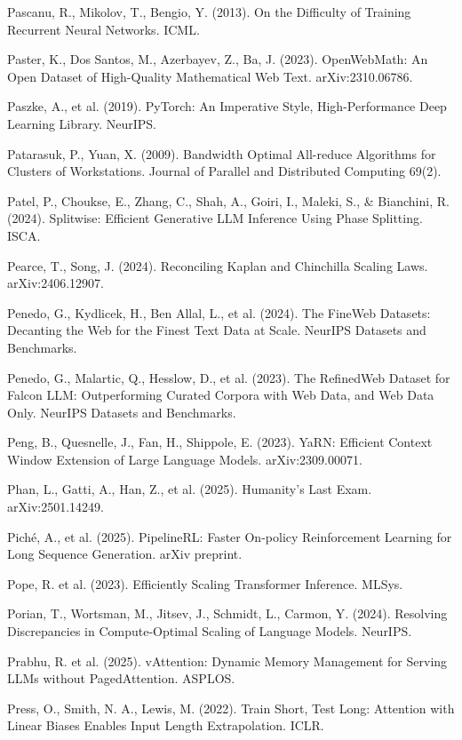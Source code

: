 {\begin{enumerate}[leftmargin=*,itemsep=1pt,label={[\arabic*]}]
\item Pascanu, R., Mikolov, T., Bengio, Y. (2013). On the Difficulty of Training Recurrent Neural Networks. ICML.
\item Paster, K., Dos Santos, M., Azerbayev, Z., Ba, J. (2023). OpenWebMath: An Open Dataset of High-Quality Mathematical Web Text. arXiv:2310.06786.
\item Paszke, A., et al. (2019). PyTorch: An Imperative Style, High-Performance Deep Learning Library. NeurIPS.
\item Patarasuk, P., Yuan, X. (2009). Bandwidth Optimal All-reduce Algorithms for Clusters of Workstations. Journal of Parallel and Distributed Computing 69(2).
\item Patel, P., Choukse, E., Zhang, C., Shah, A., Goiri, I., Maleki, S., \& Bianchini, R. (2024). Splitwise: Efficient Generative LLM Inference Using Phase Splitting. ISCA.
\item Pearce, T., Song, J. (2024). Reconciling Kaplan and Chinchilla Scaling Laws. arXiv:2406.12907.
\item Penedo, G., Kydlicek, H., Ben Allal, L., et al. (2024). The FineWeb Datasets: Decanting the Web for the Finest Text Data at Scale. NeurIPS Datasets and Benchmarks.
\item Penedo, G., Malartic, Q., Hesslow, D., et al. (2023). The RefinedWeb Dataset for Falcon LLM: Outperforming Curated Corpora with Web Data, and Web Data Only. NeurIPS Datasets and Benchmarks.
\item Peng, B., Quesnelle, J., Fan, H., Shippole, E. (2023). YaRN: Efficient Context Window Extension of Large Language Models. arXiv:2309.00071.
\item Phan, L., Gatti, A., Han, Z., et al. (2025). Humanity's Last Exam. arXiv:2501.14249.
\item Piché, A., et al. (2025). PipelineRL: Faster On-policy Reinforcement Learning for Long Sequence Generation. arXiv preprint.
\item Pope, R. et al. (2023). Efficiently Scaling Transformer Inference. MLSys.
\item Porian, T., Wortsman, M., Jitsev, J., Schmidt, L., Carmon, Y. (2024). Resolving Discrepancies in Compute-Optimal Scaling of Language Models. NeurIPS.
\item Prabhu, R. et al. (2025). vAttention: Dynamic Memory Management for Serving LLMs without PagedAttention. ASPLOS.
\item Press, O., Smith, N. A., Lewis, M. (2022). Train Short, Test Long: Attention with Linear Biases Enables Input Length Extrapolation. ICLR.

\end{enumerate}}
